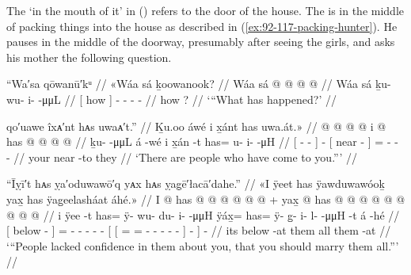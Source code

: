 The  ‘in the mouth of it’ in (\lastx) refers to the door of the house.
The  is in the middle of packing things into the house as described in (\ref{ex:92-117-packing-hunter}).
He pauses in the middle of the doorway, presumably after seeing the girls, and asks his mother the following question.

\ex\label{ex:92-119-whats-happening}%
%
\begingl
	\glpreamble	“Wa′sa qōwanū′kᵘ //
	\glpreamble	«\!Wáa sá ḵoowanook? //
	\gla	{} Wáa sá {}  @ {} @ {} @ {} @ {} //
	\glb	{} Wáa sá {} ḵu- wu- i-  -μμL //
	\glc	{}[ how  {}]
		- - -  - //
	\gld	{} how ? {}  {} {} {} {} //
	\glft	‘“What has happened?’
		//
\endgl
\xe

\ex\label{ex:92-120-people-came-to-you}%
%
\begingl
	\glpreamble	qo′uawe îxᴀ′nt hᴀs uwaᴀ′t.” //
	\glpreamble	Ḵu.oo áwé i x̱ánt has uwa.át.\!» //
	\gla	{}  @ {} @ {} @ {} {}  @ {}
		{} i  @ {} {}
		has @  @ {} @ {} @ {} //
	\glb	{} ḵu-  -μμL {} {} á -wé
		{} i x̱án -t {}
		has= u- i-  -μH //
	\glc	{}[ -  - \· {}]  -
		{}[  near - {}]
		= - -  - //
	\gld	{}  {} {} {} {}  {}
		{} your near -to {}
		they  {} {} {} //
	\glft	‘There are people who have come to you.”’
		//
\endgl
\xe

\ex\label{ex:92-121-lack-confidence-marry}%
%
\begingl
	\glpreamble	“Īỵī′t hᴀs ỵa′oduwawō′q yᴀx hᴀs ỵag̣ē′łacā′dahe.” //
	\glpreamble	«\!I ÿeet has ÿawduwawóoḵ yax̱ has ÿag̱eelasháat áhé.\!» //
	\gla	{} I  @ {} {}
		has @  @ {} @ {} @ {} @ {} @ {} +
		{} {} yax̱ @ has @  @ {} @ {} @ {} @ {} @ {} @ {} @ {} {}
		{} {}
		 @ {} //
	\glb	{} i ÿee -t {}
		has= ÿ- wu- du- i-  -μμH
		{} {} ÿáx̱= has= ÿ- {} g̱- i- l-  -μμH {} {} -t {}
		á -hé //
	\glc	{}[  below - {}]
		= - - - -
			 -
		{}[ {}[ = = - \· -
			- -  - \· {}]
			- {}]
		 - //
	\gld	{} its below -at {}
		them  {} {} {} {} {}
		{} {} all them  {} {} {} {} {} {} {}
		{} -at {} 
		 {} //
	\glft	‘“People lacked confidence in them about you, that you should marry them all.”’
		//
\endgl
\xe

